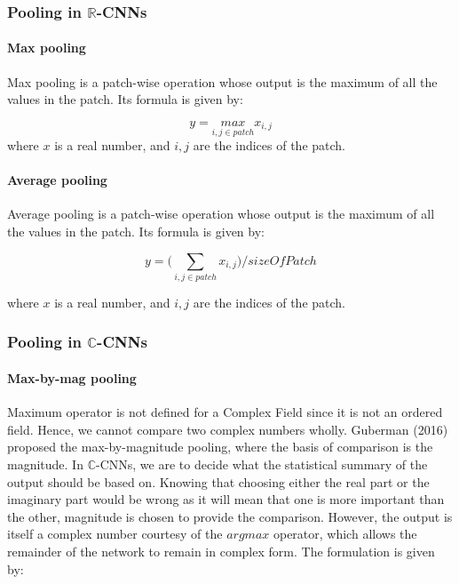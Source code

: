  \subsubsection{Pooling in $\mathbb{R}$-CNNs}
 \paragraph{Max pooling}
 Max pooling is a patch-wise operation whose output is the maximum of all the values in the patch. Its formula is given by:
 
 \begin{equation}
 y = \underset{i,j \in patch}{max} x_{i,j}
 \end{equation}
 where $x$ is a real number, and $i,j$ are the indices of the patch.
 
 \paragraph{Average pooling}
 Average pooling is a patch-wise operation whose output is the maximum of all the values in the patch. Its formula is given by:

 \begin{equation}
 y = \bigg(\underset{i,j \in patch}{\sum} x_{i,j} \bigg)/ sizeOfPatch
 \end{equation}
 
 where $x$ is a real number, and $i,j$ are the indices of the patch.
 \subsubsection{Pooling in $\mathbb{C}$-CNNs}
 \paragraph{Max-by-mag pooling}
 Maximum operator is not defined for a Complex Field since it is not an ordered field. Hence, we cannot compare two complex numbers wholly. Guberman (2016) \cite{Guberman} proposed the max-by-magnitude pooling, where the basis of comparison is the magnitude. In $\mathbb{C}$-CNNs, we are to decide what the statistical summary of the output should be based on. Knowing that choosing either the real part or the imaginary part would be wrong as it will mean that one is more important than the other, magnitude is chosen to provide the comparison. However, the output is itself a complex number courtesy of the $argmax$ operator, which allows the remainder of the network to remain in complex form. The formulation is given by:
 

